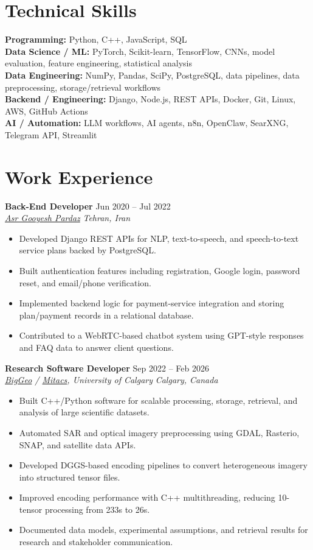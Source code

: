 \documentclass[a4paper,10pt]{article}
\newcommand{\resumeSubheading}[4]{
    \textbf{#1} \hfill #2 \\
    \textit{#3} \hfill \textit{#4}
}
\begin{document}
\section*{Technical Skills}

\textbf{Programming:} Python, C++, JavaScript, SQL \\
\textbf{Data Science / ML:} PyTorch, Scikit-learn, TensorFlow, CNNs, model evaluation, feature engineering, statistical analysis \\
\textbf{Data Engineering:} NumPy, Pandas, SciPy, PostgreSQL, data pipelines, data preprocessing, storage/retrieval workflows \\
\textbf{Backend / Engineering:} Django, Node.js, REST APIs, Docker, Git, Linux, AWS, GitHub Actions \\
\textbf{AI / Automation:} LLM workflows, AI agents, n8n, OpenClaw, SearXNG, Telegram API, Streamlit


\section*{Work Experience}

\resumeSubheading
{Back-End Developer}
{Jun 2020 -- Jul 2022}
{\href{https://asr-gooyesh.com/en/}{Asr Gooyesh Pardaz}}
{Tehran, Iran}
\begin{itemize}[leftmargin=0.25in]
    \item Developed Django REST APIs for NLP, text-to-speech, and speech-to-text service plans backed by PostgreSQL.
    \item Built authentication features including registration, Google login, password reset, and email/phone verification.
    \item Implemented backend logic for payment-service integration and storing plan/payment records in a relational database.
    \item Contributed to a WebRTC-based chatbot system using GPT-style responses and FAQ data to answer client questions.
\end{itemize}

\resumeSubheading
{Research Software Developer}
{Sep 2022 -- Feb 2026}
{\href{https://biggeo.com}{BigGeo} / \href{https://www.mitacs.ca/}{Mitacs}, University of Calgary}
{Calgary, Canada}
\begin{itemize}[leftmargin=0.25in]
    \item Built C++/Python software for scalable processing, storage, retrieval, and analysis of large scientific datasets.
    \item Automated SAR and optical imagery preprocessing using GDAL, Rasterio, SNAP, and satellite data APIs.
    \item Developed DGGS-based encoding pipelines to convert heterogeneous imagery into structured tensor files.
    \item Improved encoding performance with C++ multithreading, reducing 10-tensor processing from 233s to 26s.
    \item Documented data models, experimental assumptions, and retrieval results for research and stakeholder communication.
\end{itemize}
\end{document}

